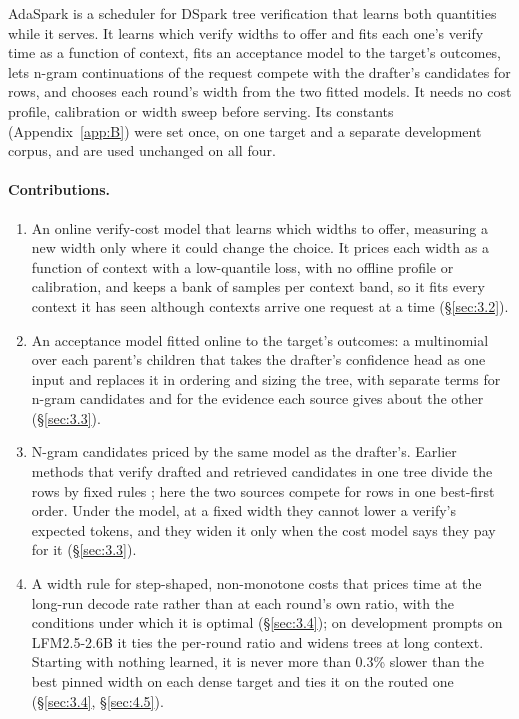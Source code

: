 \documentclass[10pt,twocolumn,letterpaper]{article}
\begin{document}
AdaSpark is a scheduler for DSpark tree verification that learns both quantities while it serves. It learns which verify widths to offer and fits each one's verify time as a function of context, fits an acceptance model to the target's outcomes, lets n-gram continuations of the request compete with the drafter's candidates for rows, and chooses each round's width from the two fitted models. It needs no cost profile, calibration or width sweep before serving. Its constants (Appendix~\ref{app:B}) were set once, on one target and a separate development corpus, and are used unchanged on all four.

\paragraph{Contributions.} 

\begin{enumerate}
\item An online verify-cost model that learns which widths to offer, measuring a new width only where it could change the choice. It prices each width as a function of context with a low-quantile loss, with no offline profile or calibration, and keeps a bank of samples per context band, so it fits every context it has seen although contexts arrive one request at a time (\S\ref{sec:3.2}).
\item An acceptance model fitted online to the target's outcomes: a multinomial over each parent's children that takes the drafter's confidence head as one input and replaces it in ordering and sizing the tree, with separate terms for n-gram candidates and for the evidence each source gives about the other (\S\ref{sec:3.3}).
\item N-gram candidates priced by the same model as the drafter's. Earlier methods that verify drafted and retrieved candidates in one tree divide the rows by fixed rules \cite{shen2026draft,quan2025rasd}; here the two sources compete for rows in one best-first order. Under the model, at a fixed width they cannot lower a verify's expected tokens, and they widen it only when the cost model says they pay for it (\S\ref{sec:3.3}).
\item A width rule for step-shaped, non-monotone costs that prices time at the long-run decode rate rather than at each round's own ratio, with the conditions under which it is optimal (\S\ref{sec:3.4}); on development prompts on LFM2.5-2.6B it ties the per-round ratio and widens trees at long context. Starting with nothing learned, it is never more than 0.3\% slower than the best pinned width on each dense target and ties it on the routed one (\S\ref{sec:3.4}, \S\ref{sec:4.5}).
\end{enumerate}
\end{document}
